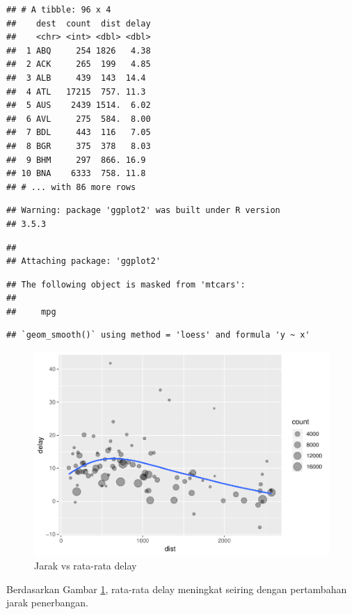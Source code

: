 \documentclass[]{book}
\begin{document}
\begin{verbatim}
## # A tibble: 96 x 4
##    dest  count  dist delay
##    <chr> <int> <dbl> <dbl>
##  1 ABQ     254 1826   4.38
##  2 ACK     265  199   4.85
##  3 ALB     439  143  14.4 
##  4 ATL   17215  757. 11.3 
##  5 AUS    2439 1514.  6.02
##  6 AVL     275  584.  8.00
##  7 BDL     443  116   7.05
##  8 BGR     375  378   8.03
##  9 BHM     297  866. 16.9 
## 10 BNA    6333  758. 11.8 
## # ... with 86 more rows
\end{verbatim}

\begin{verbatim}
## Warning: package 'ggplot2' was built under R version
## 3.5.3
\end{verbatim}

\begin{verbatim}
## 
## Attaching package: 'ggplot2'
\end{verbatim}

\begin{verbatim}
## The following object is masked from 'mtcars':
## 
##     mpg
\end{verbatim}

\begin{verbatim}
## `geom_smooth()` using method = 'loess' and formula 'y ~ x'
\end{verbatim}

\begin{figure}

{\centering \includegraphics[width=0.7\linewidth]{EnvStat_files/figure-latex/distvsave-1} 

}

\caption{Jarak vs rata-rata delay}\label{fig:distvsave}
\end{figure}

Berdasarkan Gambar \ref{fig:distvsave}, rata-rata delay meningkat
seiring dengan pertambahan jarak penerbangan.
\end{document}
